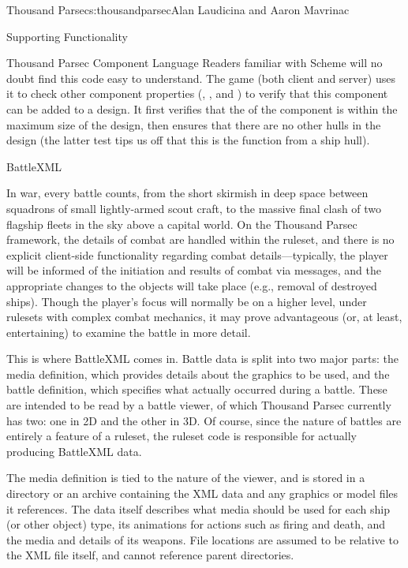 \begin{aosachapter}{Thousand Parsec}{s:thousandparsec}{Alan Laudicina and Aaron Mavrinac}
\begin{aosasect1}{Supporting Functionality}
\begin{aosasect2}{Thousand Parsec Component Language}
Readers familiar with Scheme will no doubt find this code easy to
understand. The game (both client and server) uses it to check other
component properties (, , and
) to verify that this component can be added to a
design. It first verifies that the  of the component is
within the maximum size of the design, then ensures that there are no
other hulls in the design (the latter test tips us off that this is
the  function from a ship hull).

\end{aosasect2}

\begin{aosasect2}{BattleXML}

In war, every battle counts, from the short skirmish in deep space
between squadrons of small lightly-armed scout craft, to the massive
final clash of two flagship fleets in the sky above a capital
world. On the Thousand Parsec framework, the details of combat are
handled within the ruleset, and there is no explicit client-side
functionality regarding combat details---typically, the player will be
informed of the initiation and results of combat via messages, and the
appropriate changes to the objects will take place (e.g., removal of
destroyed ships). Though the player's focus will normally be on a
higher level, under rulesets with complex combat mechanics, it may
prove advantageous (or, at least, entertaining) to examine the battle
in more detail.

This is where BattleXML comes in. Battle data is split into two major
parts: the media definition, which provides details about the graphics
to be used, and the battle definition, which specifies what actually
occurred during a battle. These are intended to be read by a battle
viewer, of which Thousand Parsec currently has two: one in 2D and the
other in 3D\@. Of course, since the nature of battles are entirely a
feature of a ruleset, the ruleset code is responsible for actually
producing BattleXML data.

The media definition is tied to the nature of the viewer, and is
stored in a directory or an archive containing the XML data and any
graphics or model files it references. The data itself describes what
media should be used for each ship (or other object) type, its
animations for actions such as firing and death, and the media and
details of its weapons. File locations are assumed to be relative to
the XML file itself, and cannot reference parent directories.


\end{aosasect2}
\end{aosasect1}
\end{aosachapter}
